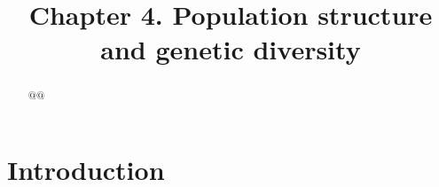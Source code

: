 \documentclass[a4paper,11pt,abstracton,hidelinks]{scrartcl}
\title{
Chapter 4. Population structure and genetic diversity
}
\author{}
\begin{document}
\renewcommand{\abstractname}{Summary}


\maketitle


\begin{abstract}


@@


\end{abstract}


\tableofcontents


\section{Introduction}\label{sec:introduction}
\end{document}
